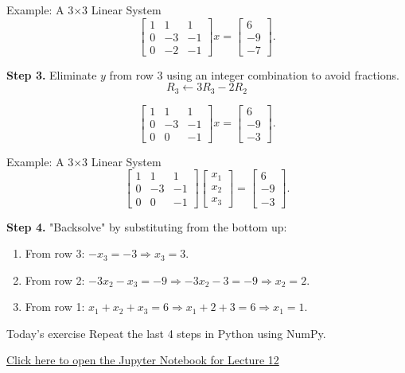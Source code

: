 \documentclass{beamer}
\begin{document}
\begin{frame}{Example: A 3$\times$3 Linear System}
\[
\left[
\begin{array}{ccc}
1 & 1 & 1 \\
0 & -3 & -1 \\
0 & -2 & -1 
\end{array}
\right] x =
\left[
\begin{array}{c}
6 \\
-9 \\
-7
\end{array}
\right].
\]

\textbf{Step 3.} Eliminate \(y\) from row 3 using an integer combination to avoid fractions.
\[
R_3 \leftarrow 3R_3 - 2R_2
\]

\[
\left[
\begin{array}{ccc}
1 & 1 & 1 \\
0 & -3 & -1 \\
0 & 0 & -1 
\end{array}
\right] x =
\left[
\begin{array}{c}
6 \\
-9 \\
-3
\end{array}
\right].
\]
\end{frame}

\begin{frame}{Example: A 3$\times$3 Linear System}
\[
\left[
\begin{array}{ccc}
1 & 1 & 1 \\
0 & -3 & -1 \\
0 & 0 & -1 
\end{array}
\right]
\left[
\begin{array}{c}
x_1  \\
x_2  \\
x_3
\end{array}
\right]
 =
\left[
\begin{array}{c}
6 \\
-9 \\
-3
\end{array}
\right].
\]

\textbf{Step 4.} "Backsolve" by substituting from the bottom up:
\begin{enumerate}
    \item From row 3: 
    \(-x_3 = -3 \Rightarrow x_3 = 3\).
    \item From row 2: 
    \(-3x_2 - x_3 = -9 \Rightarrow -3x_2 - 3 = -9 \Rightarrow x_2 = 2\).
    \item From row 1: 
    \(x_1 + x_2 + x_3 = 6 \Rightarrow x_1 + 2 + 3 = 6 \Rightarrow x_1 = 1\).
\end{enumerate}

\end{frame}

\begin{frame}{Today's exercise}
Repeat the last 4 steps in Python using NumPy.

\href{https://colab.research.google.com/github/natrask/engr1050-fall2026/blob/main/NewMaterial/Lecture12/lec12.ipynb}{Click here to open the Jupyter Notebook for Lecture 12}
\end{frame}
\end{document}
